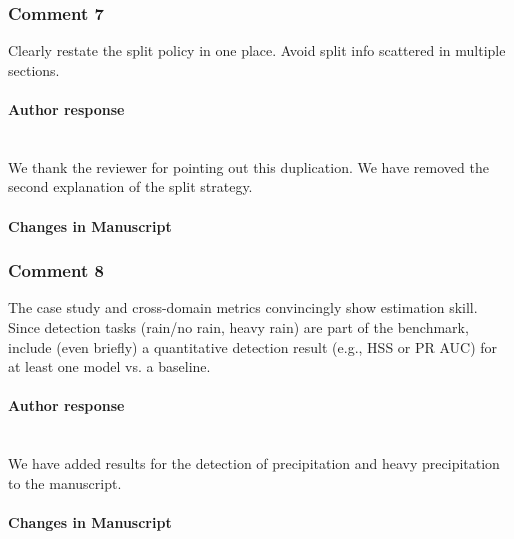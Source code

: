 \begin{itemize}
\subsubsection*{Comment 7}

\rc

Clearly restate the split policy in one place. Avoid split
info scattered in multiple sections.

\reply
\paragraph*{Author response} \\
We thank the reviewer for pointing out this duplication. We have removed the second explanation of the split strategy.

\paragraph*{Changes in Manuscript}

\begin{change}[454]

\DIFdelbegin {}\DIFdelend

\end{change}

\subsubsection*{Comment 8}

\rc
The case study and cross-domain metrics convincingly show estimation skill.
Since detection tasks (rain/no rain, heavy rain) are part of the benchmark,
include (even briefly) a quantitative detection result (e.g., HSS or PR AUC) for
at least one model vs. a baseline.

\reply
\paragraph*{Author response} \\

We have added results for the detection of precipitation and heavy precipitation to the manuscript.

\paragraph*{Changes in Manuscript} \\


\end{itemize}

